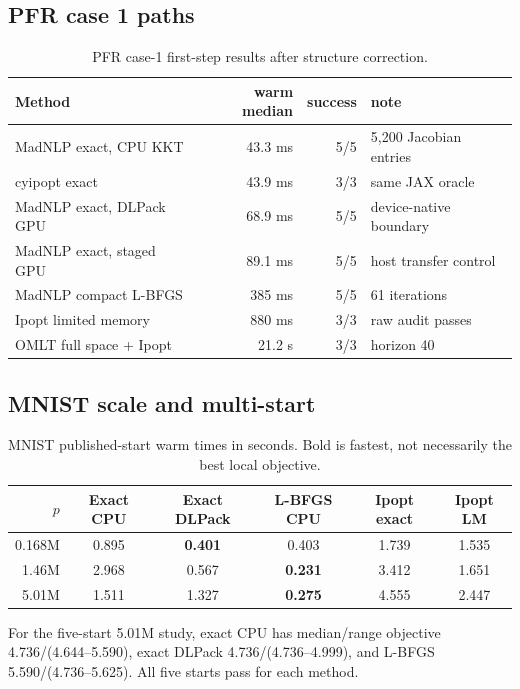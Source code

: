 \subsection{PFR case 1 paths}

\begin{table}[ht]
\centering
\caption{PFR case-1 first-step results after structure correction.}
\small
\begin{tabular}{lrrl}
\toprule
Method & warm median & success & note\\
\midrule
MadNLP exact, CPU KKT & 43.3 ms & 5/5 & 5,200 Jacobian entries\\
cyipopt exact & 43.9 ms & 3/3 & same JAX oracle\\
MadNLP exact, DLPack GPU & 68.9 ms & 5/5 & device-native boundary\\
MadNLP exact, staged GPU & 89.1 ms & 5/5 & host transfer control\\
MadNLP compact L-BFGS & 385 ms & 5/5 & 61 iterations\\
Ipopt limited memory & 880 ms & 3/3 & raw audit passes\\
OMLT full space + Ipopt & 21.2 s & 3/3 & horizon 40\\
\bottomrule
\end{tabular}
\end{table}

\subsection{MNIST scale and multi-start}

\begin{table}[H]
\centering
\caption{MNIST published-start warm times in seconds.  Bold is fastest, not
necessarily the best local objective.}
\small
\setlength{\tabcolsep}{3pt}
\begin{tabular}{rccccc}
\toprule
$p$ & Exact CPU & Exact DLPack & L-BFGS CPU & Ipopt exact & Ipopt LM\\
\midrule
0.168M & 0.895 & \textbf{0.401} & 0.403 & 1.739 & 1.535\\
1.46M  & 2.968 & 0.567 & \textbf{0.231} & 3.412 & 1.651\\
5.01M  & 1.511 & 1.327 & \textbf{0.275} & 4.555 & 2.447\\
\bottomrule
\end{tabular}
\end{table}

For the five-start 5.01M study, exact CPU has median/range objective
4.736/(4.644--5.590), exact DLPack 4.736/(4.736--4.999), and L-BFGS
5.590/(4.736--5.625).  All five starts pass for each method.

